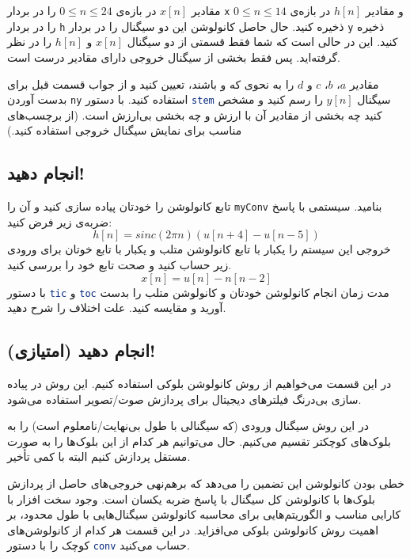 \documentclass{utsignal}
\begin{document}
		مقادیر $x[n]$ در بازه‌ی $0\le n\le24$ را در بردار \lstinline[language=Octave]{x} و مقادیر $h[n]$ در بازه‌ی $0\le n\le14$ را در بردار \lstinline[language=Octave]{h} ذخیره کنید. حال حاصل کانولوشن این دو سیگنال را در بردار \lstinline[language=Octave]{y} ذخیره کنید. این در حالی است که شما فقط قسمتی از دو سیگنال $x[n]$ و $h[n]$ را در نظر گرفته‌اید. پس فقط بخشی از سیگنال خروجی دارای مقادیر درست است.
		
		مقادیر $a$، $b$، $c$ و $d$ را به نحوی که  و  باشند، تعیین کنید و از جواب قسمت قبل برای بدست آوردن \lstinline[language=Octave]{ny} استفاده کنید. با دستور \lstinline[language=Octave]{stem} سیگنال $y[n]$ را رسم کنید و مشخص کنید چه بخشی از مقادیر آن با ارزش و چه بخشی بی‌ارزش است. (از برچسب‌های مناسب برای نمایش سیگنال خروجی استفاده کنید.)
	\subsection{انجام دهید!}
	تابع کانولوشن را خودتان پیاده سازی کنید و آن را \lstinline[language=Octave]{myConv} بنامید.
	سیستمی با پاسخ ضربه‌ی زیر فرض کنید:
	$$
	h[n] = sinc(2\pi n) (u[n + 4] - u[n - 5])
	$$
	خروجی این سیستم را یکبار با تابع کانولوشن متلب و یکبار با تابع خوتان برای ورودی زیر حساب کنید و صحت تابع خود را بررسی کنید.
	$$
	x[n]=u[n]-n[n-2]
	$$
	با دستور \lstinline[language=Octave]{tic} و \lstinline[language=Octave]{toc} مدت زمان انجام کانولوشن خودتان و کانولوشن متلب را بدست آورید و مقایسه کنید. علت اختلاف را شرح دهید.
	\subsection{انجام دهید (امتیازی)!}
	در این قسمت می‌خواهیم از روش کانولوشن بلوکی استفاده کنیم. این روش در پیاده سازی بی‌درنگ فیلترهای دیجیتال برای پردازش صوت/تصویر استفاده می‌شود.

	در این روش سیگنال ورودی (که سیگنالی با طول بی‌نهایت/نامعلوم است) را به بلوک‌های کوچکتر تقسیم می‌کنیم. حال می‌توانیم هر کدام از این بلوک‌ها را به صورت مستقل پردازش کنیم البته با کمی تأخیر. 
	
	خطی بودن کانولوشن این تضمین را می‌دهد که برهم‌نهی  خروجی‌های حاصل از پردازش بلوک‌ها با کانولوشن کل سیگنال با پاسخ ضربه یکسان است. وجود سخت افزار با کارایی مناسب و الگوریتم‌‌هایی برای محاسبه کانولوشن سیگنال‌هایی با طول محدود، بر اهمیت روش کانولوشن بلوکی ‌می‌افزاید. در این قسمت هر کدام از کانولوشن‌های کوچک را با دستور \lstinline[language=Octave]{conv} حساب می‌کنید.
	
\end{document}
